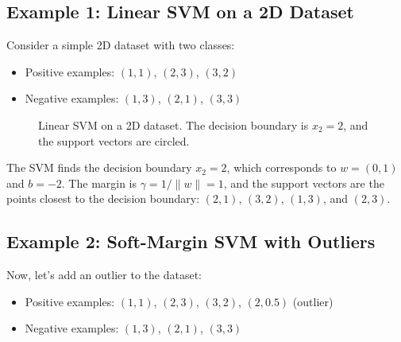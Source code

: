 \documentclass{article}
\begin{document}
\subsection{Example 1: Linear SVM on a 2D Dataset}
Consider a simple 2D dataset with two classes:
\begin{itemize}
    \item Positive examples: $(1,1)$, $(2,3)$, $(3,2)$
    \item Negative examples: $(1,3)$, $(2,1)$, $(3,3)$
\end{itemize}

\begin{figure}[h]
\centering
{}
\caption{Linear SVM on a 2D dataset. The decision boundary is $x_2 = 2$, and the support vectors are circled.}
\end{figure}

The SVM finds the decision boundary $x_2 = 2$, which corresponds to $w = (0, 1)$ and $b = -2$. The margin is $\gamma = 1/\|w\| = 1$, and the support vectors are the points closest to the decision boundary: $(2,1)$, $(3,2)$, $(1,3)$, and $(2,3)$.

\subsection{Example 2: Soft-Margin SVM with Outliers}
Now, let's add an outlier to the dataset:
\begin{itemize}
    \item Positive examples: $(1,1)$, $(2,3)$, $(3,2)$, $(2,0.5)$ (outlier)
    \item Negative examples: $(1,3)$, $(2,1)$, $(3,3)$
\end{itemize}
\end{document}
